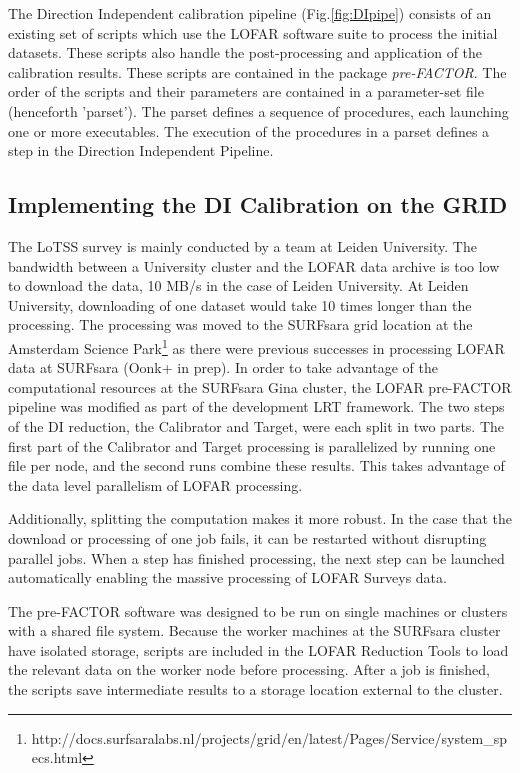 The Direction Independent calibration pipeline (Fig.\ref{fig:DIpipe}) consists of an existing set of scripts which use the LOFAR software suite\cite{lofarcookbook} to process the initial datasets. These scripts also handle the post-processing and application of the calibration results\cite{van2016lofar}. These scripts are contained in the package \emph{pre-FACTOR}\cite{prefactor}. The order of the scripts and their parameters are contained in a parameter-set file (henceforth 'parset'). The parset defines a sequence of procedures, each launching one or more executables. The execution of the procedures in a parset defines a step in the Direction Independent Pipeline. 


\subsection{Implementing the DI Calibration on the GRID}\label{sec:impl}

The LoTSS survey is mainly conducted by a team at Leiden University. The bandwidth between a University cluster and the LOFAR data archive is too low to download the data, 10 MB/s in the case of Leiden University. At Leiden University, downloading of one dataset would take 10 times longer than the processing. The processing  was moved to the SURFsara grid location at the Amsterdam Science Park\footnote{http://docs.surfsaralabs.nl/projects/grid/en/latest/Pages/Service/system\_specs.html} as there were previous successes in processing LOFAR data at SURFsara (Oonk+ in prep).  In order to take advantage of the computational resources at the SURFsara Gina cluster\cite{gina_specs}, the LOFAR pre-FACTOR pipeline was modified as part of the development LRT framework. The two steps of the DI reduction, the Calibrator and Target, were each split in two parts. The first part of the Calibrator and Target processing is parallelized by running one file per node, and the second runs combine these results. This takes advantage of the data level parallelism of LOFAR processing.

Additionally, splitting the computation makes it more robust. In the case that the download or processing of one job fails, it can be restarted without disrupting parallel jobs. When a step has finished processing, the next step can be launched automatically enabling the massive processing of LOFAR Surveys data. 

The pre-FACTOR software was designed to be run on single machines or clusters with a shared file system. Because the worker machines at the SURFsara cluster have isolated storage, scripts are included in the LOFAR Reduction Tools to load the relevant data on the worker node before processing. After a job is finished, the scripts save intermediate results to a storage location external to the cluster. 

